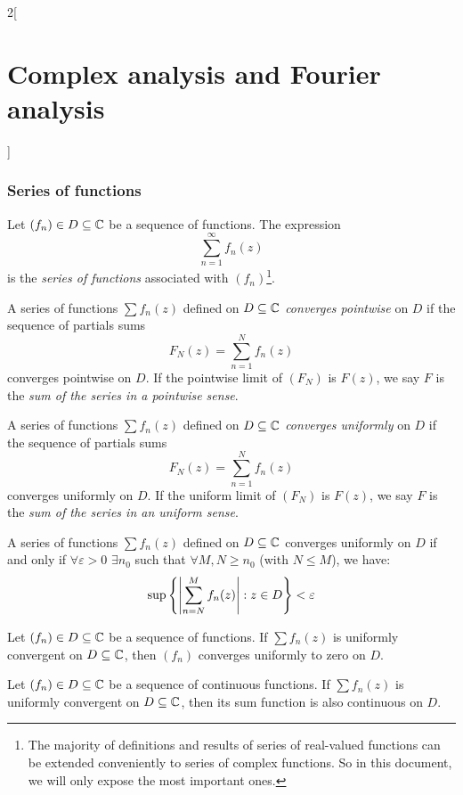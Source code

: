 \documentclass[../../../main.tex]{subfiles}
\begin{document}
\begin{multicols}{2}[\section{Complex analysis and Fourier analysis}]
  \subsubsection{Series of functions}
  \begin{definition}
    Let $(f_n)\in D\subseteq\mathbb{C}$ be a sequence of functions. The expression $$\sum_{n=1}^\infty f_n(z)$$ is the \emph{series of functions} associated with $(f_n)$\footnote{The majority of definitions and results of series of real-valued functions can be extended conveniently to series of complex functions. So in this document, we will only expose the most important ones.}.
  \end{definition}
  \begin{definition}
    A series of functions $\sum f_n(z)$ defined on $D\subseteq\mathbb{C}$ \emph{converges pointwise} on $D$ if the sequence of partials sums $$F_N(z)=\sum_{n=1}^Nf_n(z)$$ converges pointwise on $D$. If the pointwise limit of $(F_N)$ is $F(z)$, we say $F$ is the \emph{sum of the series in a pointwise sense}.
  \end{definition}
  \begin{definition}
    A series of functions $\sum f_n(z)$ defined on $D\subseteq\mathbb{C}$ \emph{converges uniformly} on $D$ if the sequence of partials sums $$F_N(z)=\sum_{n=1}^Nf_n(z)$$ converges uniformly on $D$. If the uniform limit of $(F_N)$ is $F(z)$, we say $F$ is the \emph{sum of the series in an uniform sense}.
  \end{definition}
  \begin{theorem}
    A series of functions $\sum f_n(z)$ defined on $D\subseteq\mathbb{C}$ converges uniformly on $D$ if and only if $\forall\varepsilon>0$ $\exists n_0$ such that $\forall  M, N\geq n_0$ (with $N\leq M$), we have: $$\sup\left\{\abs{\sum_{n=N}^Mf_n(z)}:z\in D\right\}< \varepsilon$$
  \end{theorem}
  \begin{corollary}
    Let $(f_n)\in D\subseteq\mathbb{C}$ be a sequence of functions. If $\sum f_n(z)$ is uniformly convergent on $D\subseteq\mathbb{C}$, then $(f_n)$ converges uniformly to zero on $D$.
  \end{corollary}
  \begin{theorem}
    Let $(f_n)\in D\subseteq\mathbb{C}$ be a sequence of continuous functions. If $\sum f_n(z)$ is uniformly convergent on $D\subseteq\mathbb{C}$, then its sum function is also continuous on $D$.
  \end{theorem}
  \begin{theorem}

\end{theorem}
\end{multicols}
\end{document}
